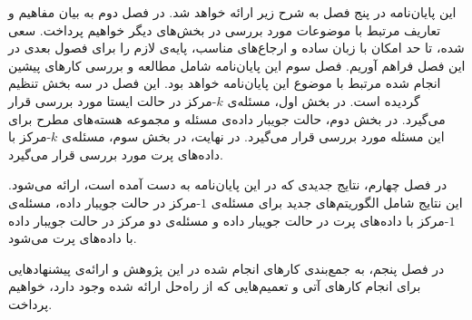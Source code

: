 
این پایان‌نامه در پنج‌ فصل به شرح زیر ارائه خواهد شد. در فصل دوم به بیان مفاهیم و تعاریف مرتبط با موضوعات مورد بررسی در بخش‌های دیگر خواهیم پرداخت. سعی شده، تا حد امکان با زبان ساده و ارجاع‌های مناسب، پایه‌ی لازم را برای فصول بعدی در این فصل فراهم آوریم. فصل سوم این پایان‌نامه شامل مطالعه و بررسی کارهای پیشین انجام شده مرتبط با موضوع این پایان‌نامه خواهد بود. این فصل در سه بخش تنظیم گردیده است. در بخش اول، مسئله‌ی $k$-مرکز در حالت ایستا مورد بررسی قرار می‌گیرد. در بخش دوم، حالت جویبار داده‌ی مسئله و مجموعه هسته‌های مطرح برای این مسئله مورد بررسی قرار می‌گیرد. در نهایت، در بخش سوم، مسئله‌ی $k$-مرکز‌ با داده‌های پرت مورد بررسی قرار می‌گیرد.

در فصل چهارم، نتایج جدیدی که در این پایان‌نامه به دست آمده است، ارائه می‌شود. این نتایج شامل الگوریتم‌های جدید برای مسئله‌ی $1$-مرکز در حالت جویبار داده،  مسئله‌ی $1$-مرکز‌ با داده‌های پرت در حالت جویبار داده و مسئله‌ی دو مرکز در حالت جویبار داده با داده‌های پرت می‌شود.

در  فصل پنجم، به جمع‌بندی کارهای انجام شده در این پژوهش و ارائه‌ی پیشنهاد‌هایی برای انجام کارهای آتی و تعمیم‌هایی که از راه‌حل ارائه شده وجود دارد، خواهیم پرداخت.